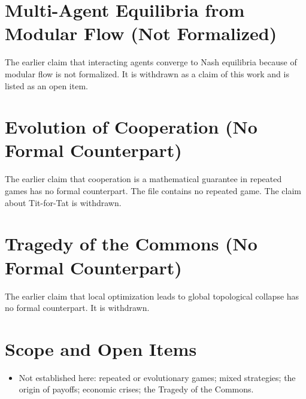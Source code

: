 \documentclass[11pt, a4paper]{article}
\begin{document}
\section{Multi-Agent Equilibria from Modular Flow (Not Formalized)}
The earlier claim that interacting agents converge to Nash equilibria because of modular flow is not formalized. It is withdrawn as a claim of this work and is listed as an open item.

\section{Evolution of Cooperation (No Formal Counterpart)}
The earlier claim that cooperation is a mathematical guarantee in repeated games has no formal counterpart. The file contains no repeated game. The claim about Tit-for-Tat is withdrawn.

\section{Tragedy of the Commons (No Formal Counterpart)}
The earlier claim that local optimization leads to global topological collapse has no formal counterpart. It is withdrawn.

\section{Scope and Open Items}
\begin{itemize}
  \item Not established here: repeated or evolutionary games; mixed strategies; the origin of payoffs; economic crises; the Tragedy of the Commons.
\end{itemize}
\end{document}
